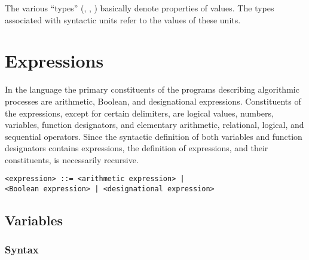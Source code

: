\documentclass[a4paper,11pt]{article}
\begin{document}
The various ``types'' (, , )
basically denote properties of values.  The types associated with
syntactic units refer to the values of these units.



\section{Expressions}
\label{LblExpressions}


In the language the primary constituents of the programs describing
algorithmic processes are arithmetic, Boolean, and designational
expressions.  Constituents of the expressions, except for certain
delimiters, are logical values, numbers, variables, function designators,
and elementary arithmetic, relational, logical, and sequential
operators.  Since the syntactic definition of both variables and
function designators contains expressions, the definition of
expressions, and their constituents, is necessarily recursive.


\begin{flushleft}
\vspace{0.2em}\texttt{<expression> ::= <arithmetic expression> |\\
  \hspace{1.0cm}<Boolean expression> | <designational expression>}\\
\end{flushleft}



\subsection{Variables}
\label{LblVariables}


\subsubsection{Syntax}
\label{LblVariablesSyntax}
\end{document}
